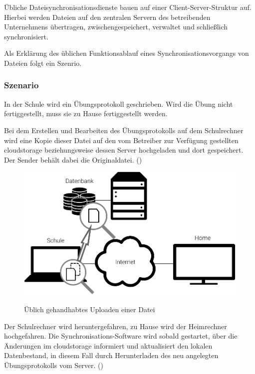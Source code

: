 Übliche Dateisynchronisationsdienste bauen auf einer Client-Server-Struktur auf.
Hierbei werden Dateien auf den zentralen Servern des betreibenden
Unternehmens übertragen, zwischengespeichert, verwaltet und schließlich
synchronisiert.

Als Erklärung des üblichen Funktionsablauf eines Synchronisationsvorgangs von
Dateien folgt ein Szenrio.

\subsubsection{Szenario}
In der Schule wird ein Übungsprotokoll geschrieben. Wird die Übung nicht
fertiggestellt, muss sie zu Hause fertiggestellt werden.

Bei dem Erstellen und Bearbeiten des Übungsprotokolls auf dem Schulrechner
wird eine Kopie dieser Datei auf den vom Betreiber zur Verfügung gestellten
\gls{cloudstorage} beziehungsweise dessen Server hochgeladen und dort gespeichert.
Der Sender behält dabei die Originaldatei. ()
\begin{figure}[H]
	\centering
  \includegraphics[]{images/dropbox_upload}
	\label{dropbox_upload}
  \caption{Üblich gehandhabtes Uploaden einer Datei}
\end{figure}

Der Schulrechner wird heruntergefahren, zu Hause wird der Heimrechner hochgefahren. Die Synchronisations-Software wird
sobald gestartet, über die Änderungen im \gls{cloudstorage} informiert und aktualisiert den lokalen Datenbestand, in
diesem Fall durch Herunterladen des neu angelegten Übungsprotokolls vom Server. ()

